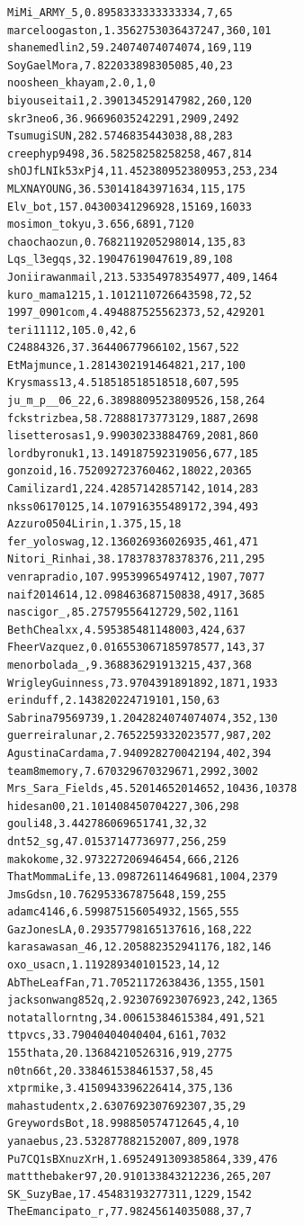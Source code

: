 \begin{verbatim}
MiMi_ARMY_5,0.8958333333333334,7,65
marceloogaston,1.3562753036437247,360,101
shanemedlin2,59.24074074074074,169,119
SoyGaelMora,7.822033898305085,40,23
noosheen_khayam,2.0,1,0
biyouseitai1,2.390134529147982,260,120
skr3neo6,36.96696035242291,2909,2492
TsumugiSUN,282.5746835443038,88,283
creephyp9498,36.58258258258258,467,814
shOJfLNIk53xPj4,11.452380952380953,253,234
MLXNAYOUNG,36.530141843971634,115,175
Elv_bot,157.04300341296928,15169,16033
mosimon_tokyu,3.656,6891,7120
chaochaozun,0.7682119205298014,135,83
Lqs_l3egqs,32.19047619047619,89,108
Joniirawanmail,213.53354978354977,409,1464
kuro_mama1215,1.1012110726643598,72,52
1997_0901com,4.494887525562373,52,429201
teri11112,105.0,42,6
C24884326,37.36440677966102,1567,522
EtMajmunce,1.2814302191464821,217,100
Krysmass13,4.518518518518518,607,595
ju_m_p__06_22,6.3898809523809526,158,264
fckstrizbea,58.72888173773129,1887,2698
lisetterosas1,9.99030233884769,2081,860
lordbyronuk1,13.149187592319056,677,185
gonzoid,16.752092723760462,18022,20365
Camilizard1,224.42857142857142,1014,283
nkss06170125,14.107916355489172,394,493
Azzuro0504Lirin,1.375,15,18
fer_yoloswag,12.136026936026935,461,471
Nitori_Rinhai,38.178378378378376,211,295
venrapradio,107.99539965497412,1907,7077
naif2014614,12.098463687150838,4917,3685
nascigor_,85.27579556412729,502,1161
BethChealxx,4.595385481148003,424,637
FheerVazquez,0.016553067185978577,143,37
menorbolada_,9.368836291913215,437,368
WrigleyGuinness,73.9704391891892,1871,1933
erinduff,2.143820224719101,150,63
Sabrina79569739,1.2042824074074074,352,130
guerreiralunar,2.7652259332023577,987,202
AgustinaCardama,7.940928270042194,402,394
team8memory,7.670329670329671,2992,3002
Mrs_Sara_Fields,45.52014652014652,10436,10378
hidesan00,21.101408450704227,306,298
gouli48,3.442786069651741,32,32
dnt52_sg,47.01537147736977,256,259
makokome,32.973227206946454,666,2126
ThatMommaLife,13.098726114649681,1004,2379
JmsGdsn,10.762953367875648,159,255
adamc4146,6.599875156054932,1565,555
GazJonesLA,0.29357798165137616,168,222
karasawasan_46,12.205882352941176,182,146
oxo_usacn,1.119289340101523,14,12
AbTheLeafFan,71.70521172638436,1355,1501
jacksonwang852q,2.923076923076923,242,1365
notatallorntng,34.00615384615384,491,521
ttpvcs,33.79040404040404,6161,7032
155thata,20.13684210526316,919,2775
n0tn66t,20.338461538461537,58,45
xtprmike,3.4150943396226414,375,136
mahastudentx,2.6307692307692307,35,29
GreywordsBot,18.998850574712645,4,10
yanaebus,23.532877882152007,809,1978
Pu7CQ1sBXnuzXrH,1.6952491309385864,339,476
mattthebaker97,20.910133843212236,265,207
SK_SuzyBae,17.45483193277311,1229,1542
TheEmancipato_r,77.98245614035088,37,7

\end{verbatim}
